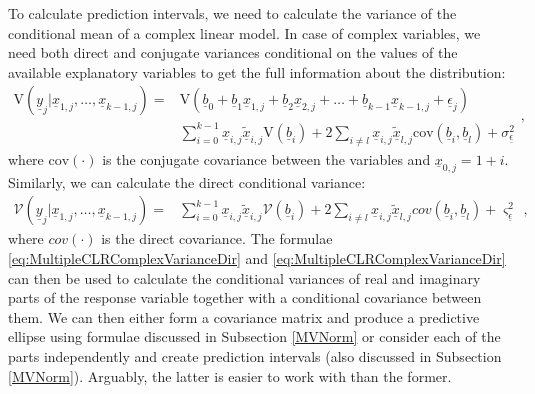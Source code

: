 \documentclass[
]{book}
\begin{document}
To calculate prediction intervals, we need to calculate the variance of the conditional mean of a complex linear model. In case of complex variables, we need both direct and conjugate variances conditional on the values of the available explanatory variables to get the full information about the distribution:
\begin{equation}
    \begin{aligned}
    \mathrm{V}\left(\underline{y}_j | \underline{x}_{1,j}, \dots, \underline{x}_{k-1,j} \right) = & \mathrm{V}\left(\underline{b}_0 + \underline{b}_1 \underline{x}_{1,j} + \underline{b}_2 \underline{x}_{2,j} + \dots + \underline{b}_{k-1} \underline{x}_{k-1,j} + \underline{\epsilon}_j\right) \\
    & \sum_{i=0}^{k-1} \underline{x}_{i,j}\underline{\tilde{x}}_{i,j} \mathrm{V}\left(\underline{b}_i \right) + 2 \sum_{i\neq l} \underline{x}_{i,j}\underline{\tilde{x}}_{l,j} \mathrm{cov}\left(\underline{b}_i, \underline{b}_l \right) + \sigma_{\underline{\epsilon}}^2
    \end{aligned},
    \label{eq:MultipleCLRComplexVarianceDir}
\end{equation}
where \(\mathrm{cov}(\cdot)\) is the conjugate covariance between the variables and \(\underline{x}_{0,j}=1+i\). Similarly, we can calculate the direct conditional variance:
\begin{equation}
    \begin{aligned}
    \mathcal{V}\left(\underline{y}_j | \underline{x}_{1,j}, \dots, \underline{x}_{k-1,j} \right) = & \sum_{i=0}^{k-1} \underline{x}_{i,j}\underline{\tilde{x}}_{i,j} \mathcal{V}\left(\underline{b}_i \right) + 2 \sum_{i\neq l} \underline{x}_{i,j}\underline{\tilde{x}}_{l,j} {cov}\left(\underline{b}_i, \underline{b}_l \right) + \varsigma_{\underline{\epsilon}}^2
    \end{aligned},
    \label{eq:MultipleCLRComplexVarianceConj}
\end{equation}
where \({cov}(\cdot)\) is the direct covariance. The formulae \eqref{eq:MultipleCLRComplexVarianceDir} and \eqref{eq:MultipleCLRComplexVarianceDir} can then be used to calculate the conditional variances of real and imaginary parts of the response variable together with a conditional covariance between them. We can then either form a covariance matrix and produce a predictive ellipse using formulae discussed in Subsection \ref{MVNorm} or consider each of the parts independently and create prediction intervals (also discussed in Subsection \ref{MVNorm}). Arguably, the latter is easier to work with than the former.
\end{document}
